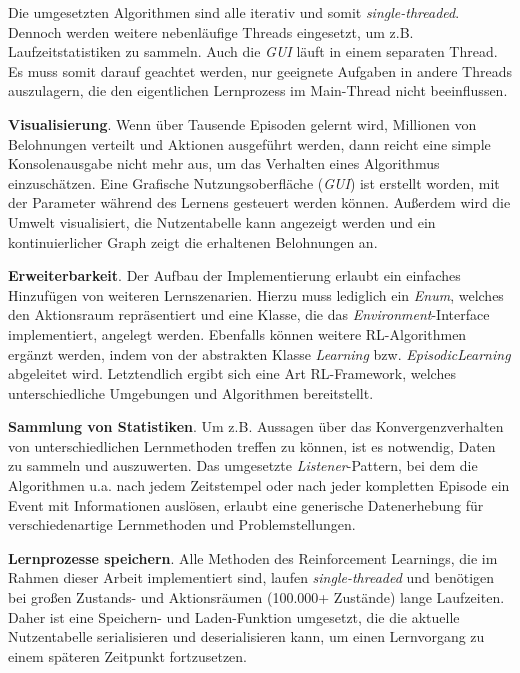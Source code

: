Die umgesetzten Algorithmen sind alle iterativ und somit \textit{single-threaded}. Dennoch werden weitere nebenläufige Threads eingesetzt, um z.B. Laufzeitstatistiken zu sammeln. Auch die \textit{GUI} läuft in einem separaten Thread. Es muss somit darauf geachtet werden, nur geeignete Aufgaben in andere Threads auszulagern, die den eigentlichen Lernprozess im Main-Thread nicht beeinflussen.
\par 
\textbf{Visualisierung}. Wenn über Tausende Episoden gelernt wird, Millionen von Belohnungen verteilt und Aktionen ausgeführt werden, dann reicht eine simple Konsolenausgabe nicht mehr aus, um das Verhalten eines Algorithmus einzuschätzen. Eine Grafische Nutzungsoberfläche (\textit{GUI}) ist erstellt worden, mit der Parameter während des Lernens gesteuert werden können. Außerdem wird die Umwelt visualisiert, die Nutzentabelle kann angezeigt werden und ein kontinuierlicher Graph zeigt die erhaltenen Belohnungen an.

\textbf{Erweiterbarkeit}. Der Aufbau der Implementierung erlaubt ein einfaches Hinzufügen von weiteren Lernszenarien. Hierzu muss lediglich ein \textit{Enum}, welches den Aktionsraum repräsentiert und eine Klasse, die das \textit{Environment}-Interface implementiert, angelegt werden. Ebenfalls können weitere RL-Algorithmen ergänzt werden, indem von der abstrakten Klasse \textit{Learning} bzw. \textit{EpisodicLearning} abgeleitet wird. Letztendlich ergibt sich eine Art RL-Framework, welches unterschiedliche Umgebungen und Algorithmen bereitstellt.

\textbf{Sammlung von Statistiken}. Um z.B. Aussagen über das Konvergenzverhalten von unterschiedlichen Lernmethoden treffen zu können, ist es notwendig, Daten zu sammeln und auszuwerten. Das umgesetzte \textit{Listener}-Pattern, bei dem die Algorithmen u.a. nach jedem Zeitstempel oder nach jeder kompletten Episode ein Event mit Informationen auslösen, erlaubt eine generische Datenerhebung für verschiedenartige Lernmethoden und Problemstellungen.

\textbf{Lernprozesse speichern}. Alle Methoden des Reinforcement Learnings, die im Rahmen dieser Arbeit implementiert sind, laufen \textit{single-threaded} und benötigen bei großen Zustands- und Aktionsräumen (100.000+ Zustände) lange Laufzeiten. Daher ist eine Speichern- und Laden-Funktion umgesetzt, die die aktuelle Nutzentabelle serialisieren und deserialisieren kann, um einen Lernvorgang zu einem späteren Zeitpunkt fortzusetzen.

